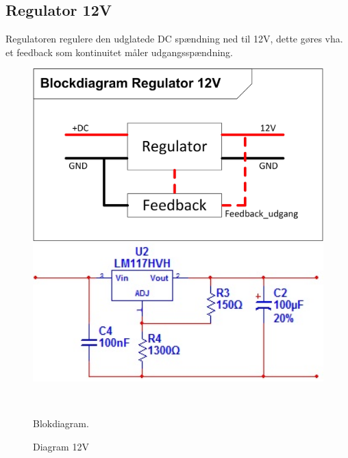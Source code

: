 \subsection{Regulator 12V}
Regulatoren regulere den udglatede DC spændning ned til 12V, dette gøres vha. et feedback som kontinuitet måler udgangsspændning. 
\begin{figure}[htbp] \centering
\begin{minipage}[c]{0.48\textwidth} \centering
\includegraphics[width=1.00\textwidth]{billeder/Regulering_12VBlok.jpg} 
\end{minipage} \hfill
\begin{minipage}[c]{0.48\textwidth} \centering
\includegraphics[width=1.00\textwidth]{billeder/Regulator_12V.jpg} 
\end{minipage} \\ 
\begin{minipage}[b]{0.48\textwidth}
\caption{Blokdiagram.} 
\label{fig:Blokdiagram_12V}
\end{minipage} \hfill
\begin{minipage}[b]{0.48\textwidth}
\caption{Diagram 12V} 
\label{fig:billede2}
\end{minipage}
\end{figure}
